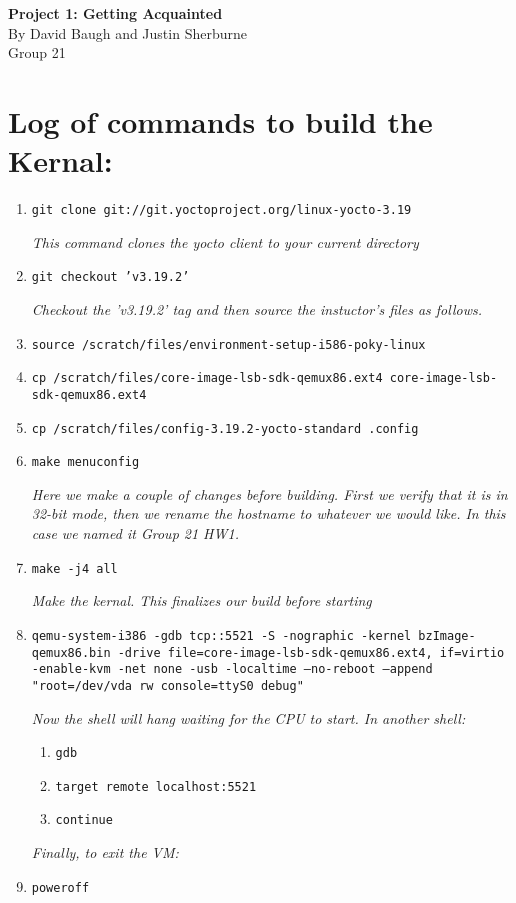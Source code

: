 \documentclass[letterpaper,10pt,titlepage]{article}
\begin{document}
\begin{center}
\textbf{\huge{Project 1: Getting Acquainted}}
\\By David Baugh and Justin Sherburne
\\Group 21
\end{center}
\section*{Log of commands to build the Kernal:}
\begin{enumerate}
\item \texttt{git clone git://git.yoctoproject.org/linux-yocto-3.19}

\textsl{This command clones the yocto client to your current directory}
\item \texttt{git checkout 'v3.19.2'}

\textsl{Checkout the 'v3.19.2' tag and then source the instuctor's files as follows.}
\item \texttt{source /scratch/files/environment-setup-i586-poky-linux}
\item \texttt{cp /scratch/files/core-image-lsb-sdk-qemux86.ext4 
core-image-lsb-sdk-qemux86.ext4}
\item \texttt{cp /scratch/files/config-3.19.2-yocto-standard .config}
\item \texttt{make menuconfig}

\textsl{Here we make a couple of changes before building. First we verify that 
it is in 32-bit mode, then we rename the hostname to whatever we would like. 
In this case we named it Group 21 HW1.}
\item \texttt{make -j4 all}

\textsl{Make the kernal. This finalizes our build before starting}
\item \texttt{qemu-system-i386 -gdb tcp::5521 -S -nographic -kernel 
bzImage-qemux86.bin -drive file=core-image-lsb-sdk-qemux86.ext4,
if=virtio -enable-kvm -net none -usb -localtime --no-reboot 
--append "root=/dev/vda rw console=ttyS0 debug"}

\textsl{Now the shell will hang waiting for the CPU to start. In another shell:}
\begin{enumerate}
	\item \texttt{gdb}
	\item \texttt{target remote localhost:5521}
	\item \texttt{continue}
\end{enumerate}
\textsl{Finally, to exit the VM:} 
\item \texttt{poweroff}
\end{enumerate}
\end{document}
